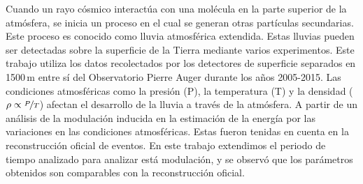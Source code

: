 \begin{resumen}%
Cuando un rayo cósmico interactúa con una molécula en la parte superior de la atmósfera, se inicia un proceso en el cual se generan otras partículas secundarias. Este proceso es conocido como lluvia atmosférica extendida. Estas lluvias pueden ser detectadas sobre la superficie de la Tierra mediante varios experimentos. Este trabajo utiliza los datos recolectados por los detectores de superficie separados en 1500\,m entre sí del Observatorio Pierre Auger durante los años 2005-2015. Las condiciones atmosféricas como la presión (P), la temperatura (T) y la densidad ($\rho \propto \nicefrac{P}{T}$) afectan el desarrollo de la lluvia a través de la atmósfera. A partir de un análisis de la modulación inducida en la estimación de la energía por las variaciones en las condiciones atmosféricas. Estas fueron tenidas en cuenta en  la reconstrucción oficial de eventos. En este trabajo extendimos el periodo de tiempo analizado para analizar está modulación, y se observó que los parámetros obtenidos son comparables con la reconstrucción oficial. 
\end{resumen}






